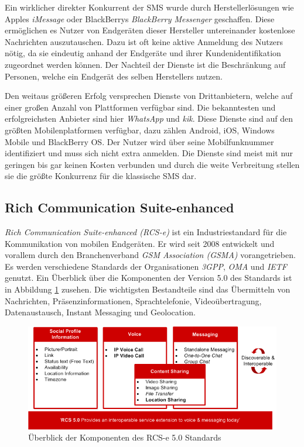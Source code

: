 \documentclass[german,12pt,a4paper]{article}
\begin{document}
 Ein wirklicher direkter Konkurrent der SMS wurde durch Herstellerlösungen wie
 Apples \textit{iMessage} oder BlackBerrys \textit{BlackBerry Messenger} geschaffen. Diese
 ermöglichen es Nutzer von Endgeräten dieser Hersteller untereinander kostenlose Nachrichten
 auszutauschen. Dazu ist oft keine aktive Anmeldung des Nutzers nötig, da sie eindeutig anhand
 der Endgeräte und ihrer Kundenidentifikation zugeordnet werden können. Der Nachteil der Dienste
 ist die Beschränkung auf Personen, welche ein Endgerät des selben Herstellers nutzen.

 Den weitaus größeren Erfolg versprechen Dienste von Drittanbietern, welche auf einer großen
 Anzahl von Plattformen verfügbar sind. Die bekanntesten und erfolgreichsten Anbieter
 sind hier \textit{WhatsApp} und \textit{kik}. Diese Dienste sind auf den größten
 Mobilenplatformen verfügbar, dazu zählen Android, iOS, Windows Mobile und BlackBerry OS. Der Nutzer wird über
 seine Mobilfunknummer identifiziert und muss sich nicht extra anmelden. Die Dienste sind meist mit
 nur geringen bis gar keinen Kosten verbunden und durch die weite Verbreitung stellen sie
 die größte Konkurrenz für die klassische SMS dar.

 \subsection{Rich Communication Suite-enhanced} %
 \label{sec:rcs-e}

  \textit{Rich Communication Suite-enhanced (RCS-e)} ist ein Industriestandard für die
  Kommunikation von mobilen Endgeräten. Er wird seit 2008 entwickelt und vorallem durch den
  Branchenverband \textit{GSM Association (GSMA)} vorangetrieben. Es werden verschiedene Standards der
  Organisationen \textit{3GPP}, \textit{OMA} und \textit{IETF} genutzt. Ein Überblick über die
  Komponenten der Version 5.0 des Standards ist in Abbildung \ref{fig:rcs-e-overview} zusehen.
  Die wichtigsten Bestandteile sind das Übermitteln von Nachrichten, Präsenzinformationen,
  Sprachtelefonie, Videoübertragung, Datenaustausch, Instant Messaging und Geolocation.

 \begin{figure}
     \centering
     \includegraphics[width=\textwidth]{img/rcs-e-overview}
     \caption{Überblick der Komponenten des RCS-e 5.0 Standards \cite{rcs:spec}}
     \label{fig:rcs-e-overview}
 \end{figure}
\end{document}
